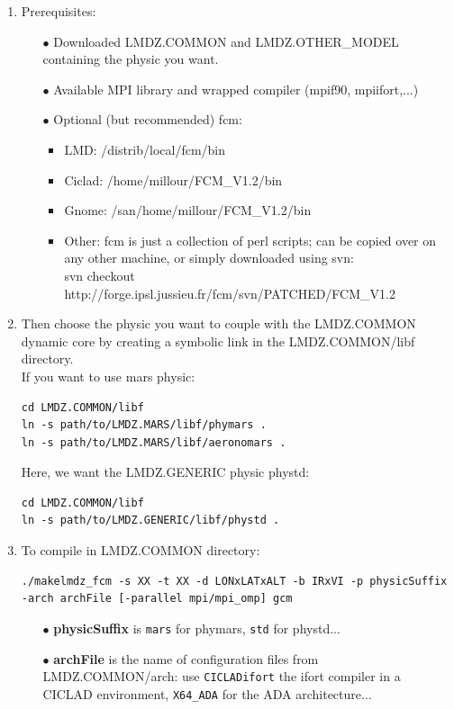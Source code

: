 \begin{enumerate}
\item Prerequisites:
\begin{itemize}
\item[$\bullet$] Downloaded LMDZ.COMMON and LMDZ.OTHER\_MODEL containing the physic you want.
\item[$\bullet$] Available MPI library and wrapped compiler (mpif90, mpiifort,...)
\item[$\bullet$] Optional (but recommended) fcm:
\begin{itemize}
\item LMD: /distrib/local/fcm/bin
\item Ciclad: /home/millour/FCM\_V1.2/bin
\item Gnome: /san/home/millour/FCM\_V1.2/bin
\item Other: fcm is just a collection of perl scripts; can be copied over on any other machine, or simply downloaded using svn:\\
svn checkout http://forge.ipsl.jussieu.fr/fcm/svn/PATCHED/FCM\_V1.2
\end{itemize}
\end{itemize}
\item Then choose the physic you want to couple with the LMDZ.COMMON dynamic core by creating a symbolic link in the LMDZ.COMMON/libf directory.\\
If you want to use mars physic:
\begin{verbatim}
cd LMDZ.COMMON/libf
ln -s path/to/LMDZ.MARS/libf/phymars .
ln -s path/to/LMDZ.MARS/libf/aeronomars .
\end{verbatim}
Here, we want the LMDZ.GENERIC physic phystd:
\begin{verbatim}
cd LMDZ.COMMON/libf
ln -s path/to/LMDZ.GENERIC/libf/phystd .
\end{verbatim}
\item  To compile in LMDZ.COMMON directory:
\begin{verbatim}
./makelmdz_fcm -s XX -t XX -d LONxLATxALT -b IRxVI -p physicSuffix 
-arch archFile [-parallel mpi/mpi_omp] gcm
\end{verbatim}
\begin{itemize}
\item[$\bullet$] \textbf{physicSuffix} is \verb|mars| for phymars, \verb|std| for phystd...
\item[$\bullet$] \textbf{archFile} is the name of configuration files from LMDZ.COMMON/arch: use \verb|CICLADifort| the ifort compiler in a CICLAD environment, \verb|X64_ADA| for the ADA architecture...

\end{itemize}
\end{enumerate}
